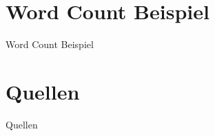 \documentclass{beamer}
\begin{document}
\section{Word Count Beispiel}
\begin{frame}[t]{Word Count Beispiel}
\end{frame}

\section{Quellen}
\begin{frame}[t]{Quellen}
\end{frame}
\end{document}
